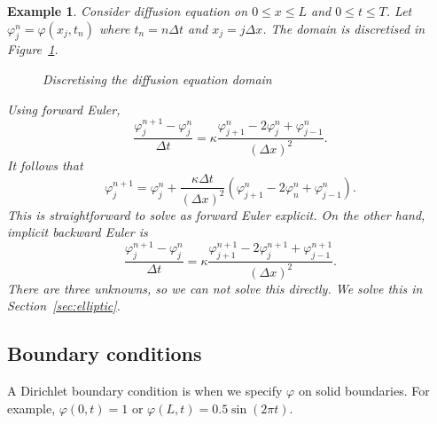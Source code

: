\documentclass[11pt, a4paper]{article}
\renewcommand{\phi}{\varphi}
\theoremstyle{break}
\newtheorem{eg}[thm]{Example}
\newcommand*{\Paren}[1]{\left(#1\right)}%
\newcommand{\dt}{\Delta t}
\newcommand{\dx}{\Delta x}
\begin{document}
\begin{eg}
	Consider diffusion equation on $0\leq x\leq L$ and $0\leq t\leq T$.  Let $\phi_j^n=\phi(x_j,t_n)$ where $t_n=n\dt$ and $x_j=j\dx$. The domain is discretised in Figure~\ref{fig:diffusionDiscret}.
	
	\begin{figure}\centering
		
		\caption{Discretising the diffusion equation domain}\label{fig:diffusionDiscret}
	\end{figure}
	
	Using forward Euler, \[\frac{\phi_j^{n+1}-\phi_j^n}{\dt}=\kappa\frac{\phi_{j+1}^n-2\phi_j^n+\phi^n_{j-1}}{(\dx)^2}.\] It follows that \[\phi_j^{n+1}=\phi_j^n+\frac{\kappa\dt}{(\dx)^2}\Paren{\phi_{j+1}^n-2\phi_n^n+\phi_{j-1}^n}.\] This is straightforward to solve as forward Euler explicit. On the other hand, implicit backward Euler is \[\frac{\phi_j^{n+1}-\phi_j^n}{\dt}=\kappa\frac{\phi_{j+1}^{n+1}-2\phi_j^{n+1}+\phi^{n+1}_{j-1}}{(\dx)^2}.\] There are three unknowns, so we can not solve this directly. We solve this in Section~\ref{sec:elliptic}.

\end{eg}

\subsection{Boundary conditions}
A Dirichlet boundary condition is when we specify $\phi$ on solid boundaries. For example, $\phi(0,t)=1$ or $\phi(L,t)=0.5\sin(2\pi t)$.
\end{document}
